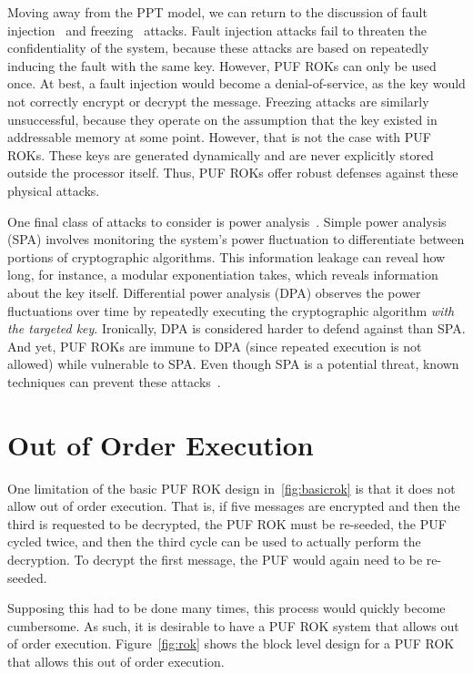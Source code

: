 Moving away from the PPT model, we can return to the discussion of fault
injection~\cite{rsapub,pertrsa,insecrsa,rsaltr,fault} and freezing~\cite{freezing}
attacks.  Fault injection attacks fail to threaten the confidentiality of the system,
because these attacks are based on repeatedly inducing the fault with the same key.  However, PUF ROKs can
only be used once.  At best, a fault injection would become a denial-of-service, as the key would not
correctly encrypt or decrypt the message.  Freezing attacks are similarly unsuccessful, because they operate
on the assumption that the key existed in addressable memory at some point.  However, that is not the case
with PUF ROKs.  These keys are generated dynamically and are never explicitly stored outside the processor
itself.  Thus, PUF ROKs offer robust defenses against these physical attacks.

One final class of attacks to consider is power analysis~\cite{dpa}.  Simple power analysis (SPA) involves
monitoring the system's power fluctuation to differentiate between portions of cryptographic algorithms.
This information leakage can reveal how long, for instance, a modular exponentiation takes, which reveals
information about the key itself.  Differential power analysis (DPA) observes the power fluctuations over
time by repeatedly executing the cryptographic algorithm \emph{with the targeted key}.  Ironically, DPA
is considered harder to defend against than SPA.  And yet, PUF ROKs are immune to DPA (since repeated execution
is not allowed) while vulnerable to SPA.  Even though SPA is a potential threat, known techniques can prevent
these attacks~\cite{sidechan}.

\section{Out of Order Execution}
One limitation of the basic PUF ROK design in~\ref{fig:basicrok} is that it does not allow out of order execution. That is,
if five messages are encrypted and then the third is requested to be decrypted, the PUF ROK must be re-seeded, the PUF
cycled twice, and then the third cycle can be used to actually perform the decryption. To decrypt the first message, the
PUF would again need to be re-seeded. 

Supposing this had to be done many times, this process would quickly become cumbersome. As such, it is desirable to
have a PUF ROK system that allows out of order execution. Figure~\ref{fig:rok} shows the block level design for a PUF
ROK that allows this out of order execution.

